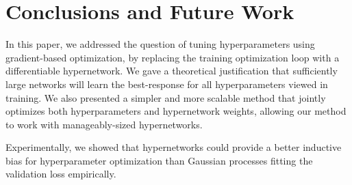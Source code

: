\documentclass{article} %
\begin{document}

\section{Conclusions and Future Work}
In this paper, we addressed the question of tuning hyperparameters using gradient-based optimization, by replacing the training optimization loop with a differentiable hypernetwork.
We gave a theoretical justification that sufficiently large networks will learn the best-response for all hyperparameters viewed in training.
We also presented a simpler and more scalable method that jointly optimizes both hyperparameters and hypernetwork weights, allowing our method to work with manageably-sized hypernetworks.

Experimentally, we showed that hypernetworks could provide a better inductive bias for hyperparameter optimization than Gaussian processes fitting the validation loss empirically.
\end{document}
